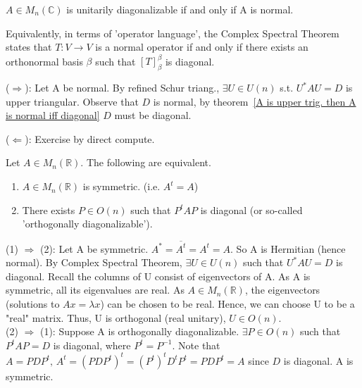 \begin{theorem}
$A\in M_{n}(\mathbb{C})$ is unitarily diagonalizable if and only if A is normal.
\end{theorem}

\begin{remark}
Equivalently, in terms of 'operator language', the Complex Spectral Theorem states that $T:V\rightarrow V$ is a normal operator if and only if there exists an orthonormal basis $\beta$ such that $[T]_{\beta}^{\beta}$ is diagonal.
\end{remark}


\begin{pfbox}
($\Rightarrow$): Let A be normal. By refined Schur triang., $\exists U \in U(n)$ s.t. $U^{*}AU = D$ is upper triangular.
Observe that $D$ is normal, by theorem~\eqref{A is upper trig. then A is normal iff diagonal} $D$ must be diagonal.

($\Leftarrow$): Exercise by direct compute.
\end{pfbox}


\begin{theorem}
Let $A\in M_{n}(\mathbb{R})$. The following are equivalent.
\begin{enumerate}
    \item $A\in M_{n}(\mathbb{R})$ is symmetric. (i.e. $A^{t}=A$)
    \item There exists $P\in O(n)$ such that $P^{t}AP$ is diagonal (or so-called 'orthogonally diagonalizable').
\end{enumerate}

\end{theorem}

\begin{pfbox}
(1) $\Rightarrow$ (2): Let A be symmetric.
$A^{*} = \overline{A^{t}} = A^{t} = A$. So A is Hermitian (hence normal).
By Complex Spectral Theorem, $\exists U \in U(n)$ such that $U^{*}AU = D$ is diagonal.
Recall the columns of U consist of eigenvectors of A.
As A is symmetric, all its eigenvalues are real. As $A \in M_{n}(\mathbb{R})$, the eigenvectors (solutions to $Ax = \lambda x$) can be chosen to be real.
Hence, we can choose U to be a "real" matrix.
Thus, U is orthogonal (real unitary), $U \in O(n)$.\\

(2) $\Rightarrow$ (1): Suppose A is orthogonally diagonalizable. 
$\exists P \in O(n)$ such that $P^{t}AP = D$ is diagonal, where $P^{t} = P^{-1}$.
Note that $A = PDP^{t},\, A^{t} = (PDP^{t})^{t} = (P^{t})^{t}D^{t}P^{t} = PDP^{t} = A$ since $D$ is diagonal.
A is symmetric.
\end{pfbox}

